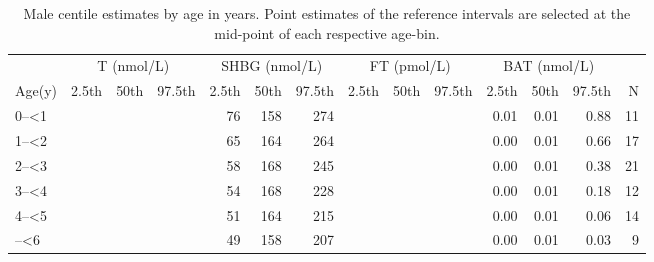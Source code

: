 \documentclass[]{elsarticle} %
\begin{document}
\begin{table}[H]

\caption{\label{tab:table1}\label{tab:tab1}Male centile estimates by age in years. Point estimates of the reference intervals are selected at the mid-point of each respective age-bin.}
\centering
\fontsize{7}{9}\selectfont
\begin{tabular}[t]{l>{}r>{}r>{}rrrr>{}r>{}r>{}rrrrr}
\toprule
\multicolumn{1}{c}{ } & \multicolumn{3}{c}{T (nmol/L)} & \multicolumn{3}{c}{SHBG (nmol/L)} & \multicolumn{3}{c}{FT (pmol/L)} & \multicolumn{3}{c}{BAT (nmol/L)} \\
\cmidrule(l{3pt}r{3pt}){2-4} \cmidrule(l{3pt}r{3pt}){5-7} \cmidrule(l{3pt}r{3pt}){8-10} \cmidrule(l{3pt}r{3pt}){11-13}
Age(y) & 2.5th & 50th & 97.5th & 2.5th & 50th & 97.5th & 2.5th & 50th & 97.5th & 2.5th & 50th & 97.5th & N\\
\midrule
0--<1 & \cellcolor[HTML]{ececec}{0.05} & \cellcolor[HTML]{ececec}{0.06} & \cellcolor[HTML]{ececec}{7.31} & 76 & 158 & 274 & \cellcolor[HTML]{ececec}{0.23} & \cellcolor[HTML]{ececec}{0.41} & \cellcolor[HTML]{ececec}{37.73} & 0.01 & 0.01 & 0.88 & 11\\
1--<2 & \cellcolor[HTML]{ececec}{0.04} & \cellcolor[HTML]{ececec}{0.06} & \cellcolor[HTML]{ececec}{6.13} & 65 & 164 & 264 & \cellcolor[HTML]{ececec}{0.16} & \cellcolor[HTML]{ececec}{0.31} & \cellcolor[HTML]{ececec}{28.08} & 0.00 & 0.01 & 0.66 & 17\\
2--<3 & \cellcolor[HTML]{ececec}{0.03} & \cellcolor[HTML]{ececec}{0.05} & \cellcolor[HTML]{ececec}{4.39} & 58 & 168 & 245 & \cellcolor[HTML]{ececec}{0.17} & \cellcolor[HTML]{ececec}{0.26} & \cellcolor[HTML]{ececec}{16.12} & 0.00 & 0.01 & 0.38 & 21\\
3--<4 & \cellcolor[HTML]{ececec}{0.03} & \cellcolor[HTML]{ececec}{0.05} & \cellcolor[HTML]{ececec}{2.93} & 54 & 168 & 228 & \cellcolor[HTML]{ececec}{0.20} & \cellcolor[HTML]{ececec}{0.26} & \cellcolor[HTML]{ececec}{7.47} & 0.00 & 0.01 & 0.18 & 12\\
4--<5 & \cellcolor[HTML]{ececec}{0.03} & \cellcolor[HTML]{ececec}{0.05} & \cellcolor[HTML]{ececec}{1.79} & 51 & 164 & 215 & \cellcolor[HTML]{ececec}{0.22} & \cellcolor[HTML]{ececec}{0.31} & \cellcolor[HTML]{ececec}{2.49} & 0.00 & 0.01 & 0.06 & 14\\
\addlinespace
5--<6 & \cellcolor[HTML]{ececec}{0.04} & \cellcolor[HTML]{ececec}{0.06} & \cellcolor[HTML]{ececec}{0.97} & 49 & 158 & 207 & \cellcolor[HTML]{ececec}{0.17} & \cellcolor[HTML]{ececec}{0.42} & \cellcolor[HTML]{ececec}{1.17} & 0.00 & 0.01 & 0.03 & 9\\

\end{tabular}
\end{table}
\end{document}
